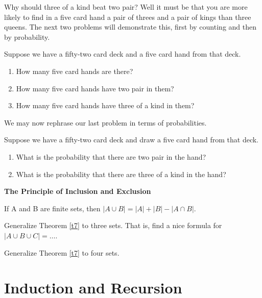 Why should three of a kind beat two pair? Well it must be that you are more likely to find in a five card hand a pair of threes and a pair of kings than three queens.  The next two problems will demonstrate this, first by counting and then by probability.

\begin{prb}
Suppose we have a fifty-two card deck and a five card hand from that deck.
\begin{enumerate}
\item How many five card hands are there?
\item How many five card hands have two pair in them?
\item How many five card hands have three of a kind in them?
\end{enumerate}
\end{prb}

We may now rephrase our last problem in terms of probabilities.

\begin{prb}
Suppose we have a fifty-two card deck and draw a five card hand from that deck.
\begin{enumerate}
\item What is the probability that there are two pair in the hand?
\item What is the probability that there are three of a kind in the hand?
\end{enumerate}
\end{prb}

\noindent
\textbf{The Principle of Inclusion and Exclusion}

\begin{thm}
\label{t7}
If A and B are finite sets, then $|A \cup B| = |A| + |B|  - |A \cap B|$.
\end{thm}

\begin{prb}
Generalize Theorem \ref{t7} to three sets. That is, find a nice formula for $|A \cup B \cup C| = \dots$.
\end{prb}

\begin{prb}
Generalize Theorem \ref{t7} to four sets.
\end{prb}


\chapter{Induction and Recursion}

